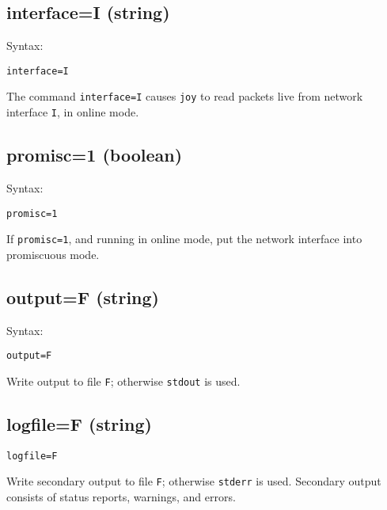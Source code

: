 \documentclass{book}
\begin{document}
\subsection{interface=I (string)}
\label{interface}
\begin{mdframed}[style=aaa]
Syntax:
  \begin{verbatim}
interface=I               
  \end{verbatim}
\end{mdframed}
The command \texttt{interface=I} causes \texttt{joy} to read packets
live from network interface \texttt{I}, in online mode.  

\subsection{promisc=1 (boolean)}
\label{promisc}
\begin{mdframed}[style=aaa]
Syntax:
  \begin{verbatim}
promisc=1                 
  \end{verbatim}
\end{mdframed}
If \texttt{promisc=1}, and running in online mode, put the network
interface into promiscuous mode.

\subsection{output=F (string)}
\label{output}
\begin{mdframed}[style=aaa]
Syntax:
  \begin{verbatim}
output=F                   
  \end{verbatim}
\end{mdframed}
Write output to file \texttt{F}; otherwise \texttt{stdout} is used.

\subsection{logfile=F (string)}
\label{logfile}
\begin{mdframed}[style=aaa]
  \begin{verbatim}
logfile=F                  
  \end{verbatim}
\end{mdframed}
Write secondary output to file \texttt{F}; otherwise \texttt{stderr} is used.
Secondary output consists of status reports, warnings, and errors.
\end{document}
